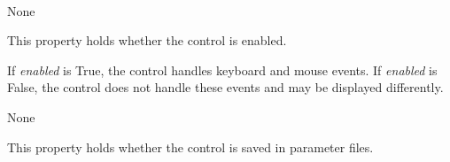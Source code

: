 \documentclass[letterpaper,10pt,english]{sphinxmanual}
\begin{document}
\begin{fulllineitems}
\label{api:controls.EventButton}~

\begin{fulllineitems}
\label{api:controls.EventButton.action}
None

\end{fulllineitems}


\begin{fulllineitems}
\label{api:controls.EventButton.clear}
\end{fulllineitems}


\begin{fulllineitems}
\label{api:controls.EventButton.enabled}
This property holds whether the control is enabled.

If \emph{enabled} is True, the control handles keyboard and mouse events.
If \emph{enabled} is False, the control does not handle these events and may
be displayed differently.

\end{fulllineitems}


\begin{fulllineitems}
\label{api:controls.EventButton.is_set}
\end{fulllineitems}


\begin{fulllineitems}
\label{api:controls.EventButton.label}
None

\end{fulllineitems}


\begin{fulllineitems}
\label{api:controls.EventButton.save}
This property holds whether the control is saved in parameter files.


\end{fulllineitems}
\end{fulllineitems}
\end{document}
